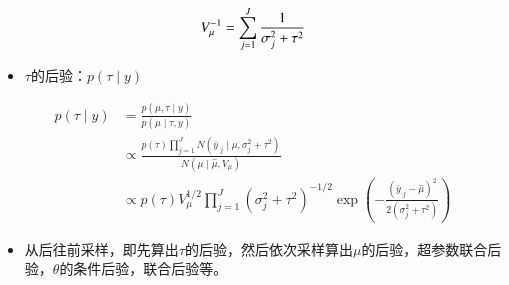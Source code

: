 \[\\V_{\mu}^{-1}=\sum_{j=1}^{J} \frac{1}{\sigma_{j}^{2}+\tau^{2}}\]

\begin{itemize}
\item
  \(\tau\)的后验：\(p(\tau \mid y) \)
\end{itemize}

\begin{equation}
  \begin{aligned}
    p(\tau \mid y) 
    &=\frac{p(\mu, \tau \mid y)}{p(\mu \mid \tau, y)} \\
    &\propto 
    \frac{p(\tau) \prod_{j=1}^{J} 
    N\left(\bar{y}_{ \cdot j }\mid \mu, \sigma_{j}^{2}+\tau^{2}\right)}
    {N\left(\mu \mid \hat{\mu}, V_{\mu}\right)} \\
    & \propto p(\tau) V_{\mu}^{1 / 2} 
    \prod_{j=1}^{J}\left(\sigma_{j}^{2}+\tau^{2}\right)^{-1 / 2} 
    \exp \left(
    -\frac{\left(\bar{y}_{\cdot j}-\hat{\mu}\right)^{2}}{2\left(\sigma_{j}^{2}+\tau^{2}\right)}
    \right)
    \end{aligned}
\end{equation}


\begin{itemize}
\item
  从后往前采样，即先算出\(\tau\)的后验，然后依次采样算出\(\mu\)的后验，超参数联合后验，\(\theta\)的条件后验，联合后验等。
\end{itemize}